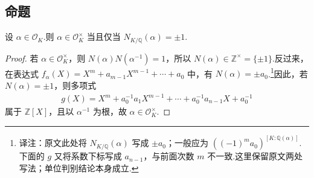 \subsection{命题}\label{sec:nt-5-3-1}
设 $\alpha\in\mathcal O_K$.则 $\alpha\in\mathcal O_K^\times$ 当且仅当 $N_{K/\mathbb Q}(\alpha)=\pm1$.
\begin{proof}
若 $\alpha\in\mathcal O_K^\times$，则 $N(\alpha)N(\alpha^{-1})=1$，所以 $N(\alpha)\in\mathbb Z^\times=\{\pm1\}$.反过来，在表达式 $f_\alpha(X)=X^m+a_{m-1}X^{m-1}+\cdots+a_0$ 中，有 $N(\alpha)=\pm a_0$.\footnote{译注：原文此处将 $N_{K/\mathbb Q}(\alpha)$ 写成 $\pm a_0$；一般应为 $((-1)^m a_0)^{[K:\mathbb Q(\alpha)]}$.下面的 $g$ 又将系数下标写成 $a_{n-1}$，与前面次数 $m$ 不一致.这里保留原文两处写法；单位判别结论本身成立.}因此，若 $N(\alpha)=\pm1$，则多项式
\begin{align*}
g(X)=X^m+a_0^{-1}a_1X^{m-1}+\cdots+a_0^{-1}a_{n-1}X+a_0^{-1}
\end{align*}
属于 $\mathbb Z[X]$，且以 $\alpha^{-1}$ 为根，故 $\alpha\in\mathcal O_K^\times$.
\end{proof}
